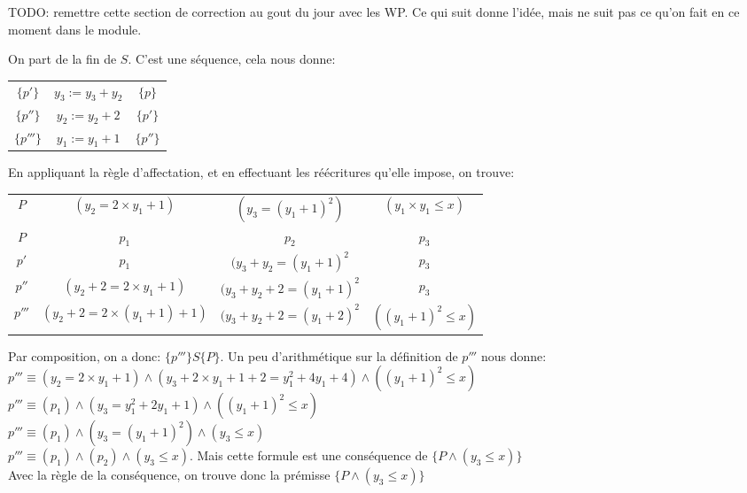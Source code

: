 \documentclass[10pt]{article}\usepackage[correction,nu]{esial}
\begin{document}
\begin{Reponse}
  TODO: remettre cette section de correction au gout du jour avec les WP. Ce qui
  suit donne l'idée, mais ne suit pas ce qu'on fait en ce moment dans le module.

  On part de la fin de $S$. C'est une séquence, cela nous donne:
  \begin{center}
    \begin{tabular}{ccc}
      $\{p'\}$&$y_3:=y_3+y_2$&$\{p\}$\\
      $\{p''\}$&$y_2:=y_2+2$&$\{p'\}$\\
      $\{p'''\}$&$y_1:=y_1+1$&$\{p''\}$\\
    \end{tabular}
  \end{center}

  En appliquant la règle d'affectation, et en effectuant les réécritures
  qu'elle impose, on trouve:

  \begin{center}
    \begin{tabular}{c@{~$\equiv$~}c@{~$\wedge$~}c@{~$\wedge$~}c}
      $P$   &$(y_2=2\times y_1 + 1)$&$(y_3=(y_1+1)^2)$&$(y_1\times y_1 \leq x)$\\
      $P$   &$p_1$&$p_2$&$p_3$\\
      $p'$  &$p_1$&$(y_3+y_2=(y_1+1)^2$&$p_3$\\
      $p''$ &$(y_2+2=2\times y_1+1)$&$(y_3+y_2+2=(y_1+1)^2$&$p_3$\\
      $p'''$&$(y_2+2=2\times (y_1+1)+1)$&$(y_3+y_2+2=(y_1+2)^2$&$((y_1+1)^2 \leq x)$\\
    \end{tabular}
  \end{center}
  
  Par composition, on a donc: $\{p'''\} S \{P\}$. 
  Un peu d'arithmétique sur la définition de $p'''$ nous donne:
  $p'''\equiv (y_2=2\times y_1+1)\wedge(y_3+2\times y_1+1+2=y_1^2+4y_1+4)\wedge((y_1+1)^2 \leq x)$\\
  $p'''\equiv (p_1)\wedge(y_3=y_1^2+2y_1+1)\wedge((y_1+1)^2 \leq x)$ \\
  $p'''\equiv (p_1)\wedge(y_3=(y_1+1)^2)\wedge(y_3 \leq x)$ \\
  $p'''\equiv (p_1)\wedge(p_2)\wedge(y_3 \leq x)$. Mais cette formule est une
  conséquence de $\{P\wedge(y_3 \leq x)\}$ \\

  Avec la règle de la conséquence, on trouve donc la prémisse $\{P\wedge(y_3 \leq x)\}$ 
\end{Reponse}
\end{document}
